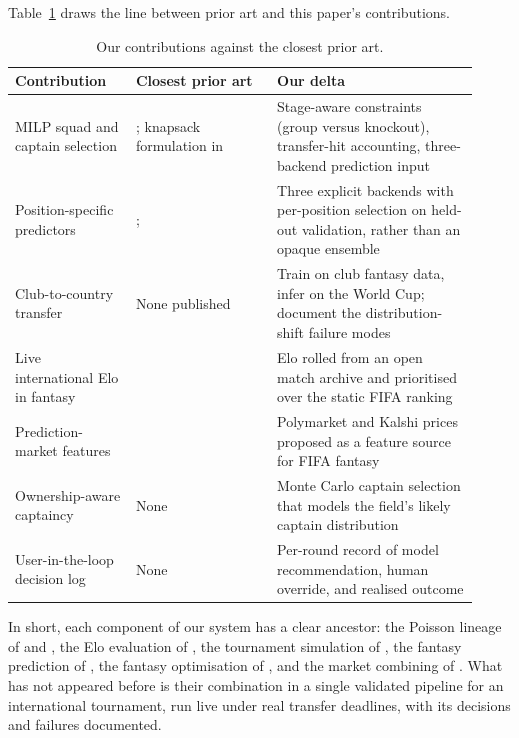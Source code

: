 Table~\ref{tab:contributions-prior-art} draws the line between prior
art and this paper's contributions.

\begin{table}[t]
\centering
\small
\begin{tabular}{@{}p{0.24\linewidth}p{0.28\linewidth}p{0.40\linewidth}@{}}
\toprule
Contribution & Closest prior art & Our delta \\
\midrule
MILP squad and captain selection &
\citet{mishra2025fpl}; knapsack formulation in
\citet{winston2022mathletics} &
Stage-aware constraints (group versus knockout), transfer-hit
accounting, three-backend prediction input \\
\addlinespace
Position-specific predictors &
\citet{groos2025openfpl}; \citet{bunker2024soccer} &
Three explicit backends with per-position selection on held-out
validation, rather than an opaque ensemble \\
\addlinespace
Club-to-country transfer &
None published &
Train on club fantasy data, infer on the World Cup; document the
distribution-shift failure modes \\
\addlinespace
Live international Elo in fantasy &
\citet{hvattum2010using} &
Elo rolled from an open match archive \citep{martj42} and
prioritised over the static FIFA ranking \\
\addlinespace
Prediction-market features &
\citet{benter1994computer} &
Polymarket and Kalshi prices proposed as a feature source for FIFA
fantasy \\
\addlinespace
Ownership-aware captaincy &
None &
Monte Carlo captain selection that models the field's likely
captain distribution \\
\addlinespace
User-in-the-loop decision log &
None &
Per-round record of model recommendation, human override, and
realised outcome \\
\bottomrule
\end{tabular}
\caption{Our contributions against the closest prior art.}
\label{tab:contributions-prior-art}
\end{table}

In short, each component of our system has a clear ancestor: the
Poisson lineage of \citet{maher1982modelling} and
\citet{dixon1997modelling}, the Elo evaluation of
\citet{hvattum2010using}, the tournament simulation of
\citet{gilch2018elo}, the fantasy prediction of
\citet{groos2025openfpl}, the fantasy optimisation of
\citet{mishra2025fpl}, and the market combining of
\citet{benter1994computer}. What has not appeared before is their
combination in a single validated pipeline for an international
tournament, run live under real transfer deadlines, with its
decisions and failures documented.

